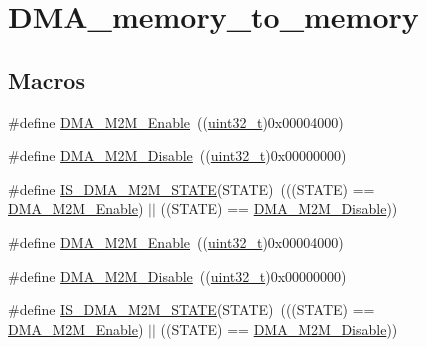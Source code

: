 \hypertarget{group___d_m_a__memory__to__memory}{}\section{D\+M\+A\+\_\+memory\+\_\+to\+\_\+memory}
\label{group___d_m_a__memory__to__memory}
\subsection*{Macros}
\begin{DoxyCompactItemize}
\item 
\#define \hyperlink{group___d_m_a__memory__to__memory_ga046a1de15235c254c0511c08cae3065a}{D\+M\+A\+\_\+\+M2\+M\+\_\+\+Enable}~((\hyperlink{_p_e___types_8h_a33594304e786b158f3fb30289278f5af}{uint32\+\_\+t})0x00004000)
\item 
\#define \hyperlink{group___d_m_a__memory__to__memory_ga86e0a7076f0badd509fac6576f3b5355}{D\+M\+A\+\_\+\+M2\+M\+\_\+\+Disable}~((\hyperlink{_p_e___types_8h_a33594304e786b158f3fb30289278f5af}{uint32\+\_\+t})0x00000000)
\item 
\#define \hyperlink{group___d_m_a__memory__to__memory_gae0241d6265efc45f87b113cf44e50c06}{I\+S\+\_\+\+D\+M\+A\+\_\+\+M2\+M\+\_\+\+S\+T\+A\+TE}(S\+T\+A\+TE)~(((S\+T\+A\+TE) == \hyperlink{openmotestm_2library_2inc_2stm32f10x__dma_8h_a046a1de15235c254c0511c08cae3065a}{D\+M\+A\+\_\+\+M2\+M\+\_\+\+Enable}) $\vert$$\vert$ ((S\+T\+A\+TE) == \hyperlink{openmotestm_2library_2inc_2stm32f10x__dma_8h_a86e0a7076f0badd509fac6576f3b5355}{D\+M\+A\+\_\+\+M2\+M\+\_\+\+Disable}))
\item 
\#define \hyperlink{group___d_m_a__memory__to__memory_ga046a1de15235c254c0511c08cae3065a}{D\+M\+A\+\_\+\+M2\+M\+\_\+\+Enable}~((\hyperlink{_p_e___types_8h_a33594304e786b158f3fb30289278f5af}{uint32\+\_\+t})0x00004000)
\item 
\#define \hyperlink{group___d_m_a__memory__to__memory_ga86e0a7076f0badd509fac6576f3b5355}{D\+M\+A\+\_\+\+M2\+M\+\_\+\+Disable}~((\hyperlink{_p_e___types_8h_a33594304e786b158f3fb30289278f5af}{uint32\+\_\+t})0x00000000)
\item 
\#define \hyperlink{group___d_m_a__memory__to__memory_gae0241d6265efc45f87b113cf44e50c06}{I\+S\+\_\+\+D\+M\+A\+\_\+\+M2\+M\+\_\+\+S\+T\+A\+TE}(S\+T\+A\+TE)~(((S\+T\+A\+TE) == \hyperlink{openmotestm_2library_2inc_2stm32f10x__dma_8h_a046a1de15235c254c0511c08cae3065a}{D\+M\+A\+\_\+\+M2\+M\+\_\+\+Enable}) $\vert$$\vert$ ((S\+T\+A\+TE) == \hyperlink{openmotestm_2library_2inc_2stm32f10x__dma_8h_a86e0a7076f0badd509fac6576f3b5355}{D\+M\+A\+\_\+\+M2\+M\+\_\+\+Disable}))
\end{DoxyCompactItemize}


